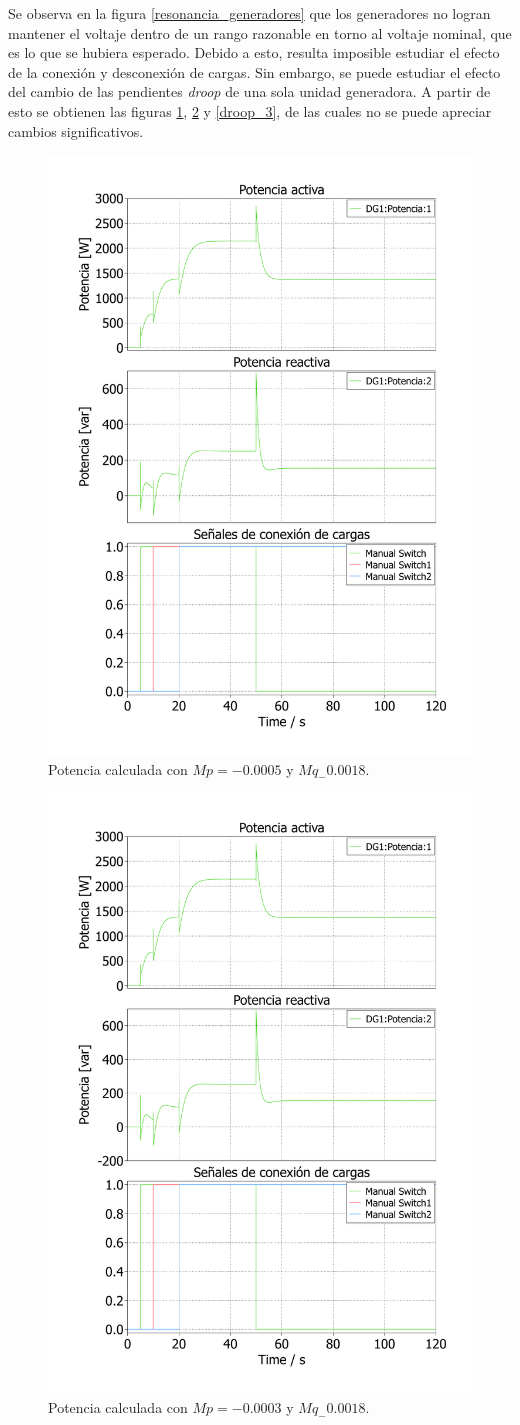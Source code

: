 Se observa en la figura \ref{resonancia_generadores} que los generadores no logran mantener el voltaje dentro de un rango razonable en torno al voltaje nominal, que es lo que se hubiera esperado. Debido a esto, resulta imposible estudiar el efecto de la conexión y desconexión de cargas. Sin embargo, se puede estudiar el efecto del cambio de las pendientes \textit{droop} de una sola unidad generadora. A partir de esto se obtienen las figuras \ref{droop_1}, \ref{droop_2} y \ref{droop_3}, de las cuales no se puede apreciar cambios significativos.


\begin{figure}
   \centering
   \includegraphics[width=0.5\linewidth]{Tarea 1/report/imagenes/p3a/droop_1.pdf}
   \caption{Potencia calculada con $Mp = -0.0005$ y $Mq_-0.0018$.}
   \label{droop_1}
\end{figure}

\begin{figure}
   \centering
   \includegraphics[width=0.5\linewidth]{Tarea 1/report/imagenes/p3a/droop_2.pdf}
   \caption{Potencia calculada con $Mp = -0.0003$ y $Mq_-0.0018$.}
   \label{droop_2}
\end{figure}

